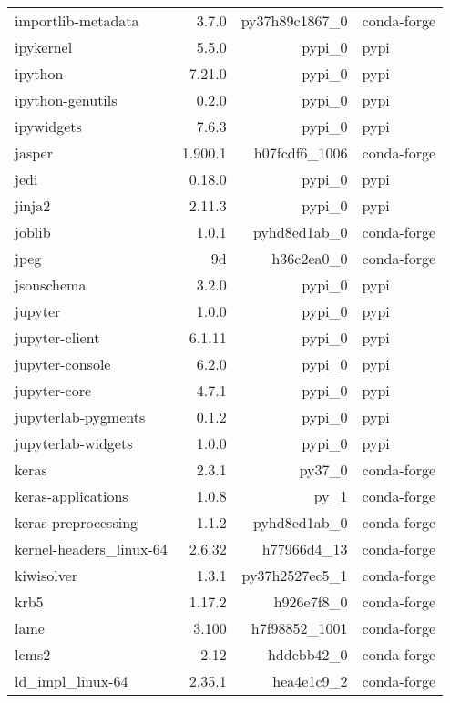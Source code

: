 \begin{table}
\begin{center}
\begin{tabular}{|l|r|r|l|}
			importlib-metadata &3.7.0 & py37h89c1867\_0 &conda-forge \\
			ipykernel &5.5.0 & pypi\_0 &pypi \\
			ipython &7.21.0 & pypi\_0 &pypi \\
			ipython-genutils &0.2.0 & pypi\_0 &pypi \\
			ipywidgets &7.6.3 & pypi\_0 &pypi \\
			jasper &1.900.1 & h07fcdf6\_1006 &conda-forge \\
			jedi &0.18.0 & pypi\_0 &pypi \\
			jinja2 &2.11.3 & pypi\_0 &pypi \\
			joblib &1.0.1 & pyhd8ed1ab\_0 &conda-forge \\
			jpeg &9d & h36c2ea0\_0 &conda-forge \\
			jsonschema &3.2.0 & pypi\_0 &pypi \\
			jupyter &1.0.0 & pypi\_0 &pypi \\
			jupyter-client &6.1.11 & pypi\_0 &pypi \\
			jupyter-console &6.2.0 & pypi\_0 &pypi \\
			jupyter-core &4.7.1 & pypi\_0 &pypi \\
			jupyterlab-pygments &0.1.2 & pypi\_0 &pypi \\
			jupyterlab-widgets &1.0.0 & pypi\_0 &pypi \\
			keras &2.3.1 & py37\_0 &conda-forge \\
			keras-applications &1.0.8 & py\_1 &conda-forge \\
			keras-preprocessing &1.1.2 & pyhd8ed1ab\_0 &conda-forge \\
			kernel-headers\_linux-64 &2.6.32 & h77966d4\_13 &conda-forge \\
			kiwisolver &1.3.1 & py37h2527ec5\_1 &conda-forge \\
			krb5 &1.17.2 & h926e7f8\_0 &conda-forge \\
			lame &3.100 & h7f98852\_1001 &conda-forge \\
			lcms2 &2.12 & hddcbb42\_0 &conda-forge \\
			ld\_impl\_linux-64 &2.35.1 & hea4e1c9\_2 &conda-forge \\
			
				
		\end{tabular}
	\end{center}
\end{table}			


